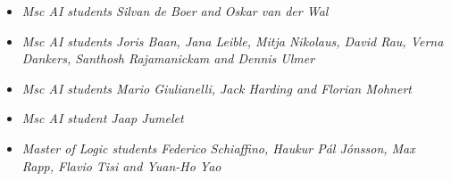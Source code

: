 {{{{{{{
{\begin{itemize}
  \item[] \textit{Msc AI students Silvan de Boer and Oskar van der Wal}
\end{itemize}}}

{
{\begin{itemize}
  \item[] \textit{Msc AI students Joris Baan, Jana Leible, Mitja Nikolaus, David Rau, Verna Dankers, Santhosh Rajamanickam and Dennis Ulmer}
\end{itemize}}}

{
{\begin{itemize}
  \item[] \textit{Msc AI students Mario Giulianelli, Jack Harding and Florian Mohnert}
\end{itemize}}}

{
{\begin{itemize}
  \item[] \textit{Msc AI student Jaap Jumelet}
\end{itemize}}}


{
{\begin{itemize}
  \item[] \textit{Master of Logic students Federico Schiaffino, Haukur Pál Jónsson, Max Rapp, Flavio Tisi and Yuan-Ho Yao}
\end{itemize}}}



}}}}}}

